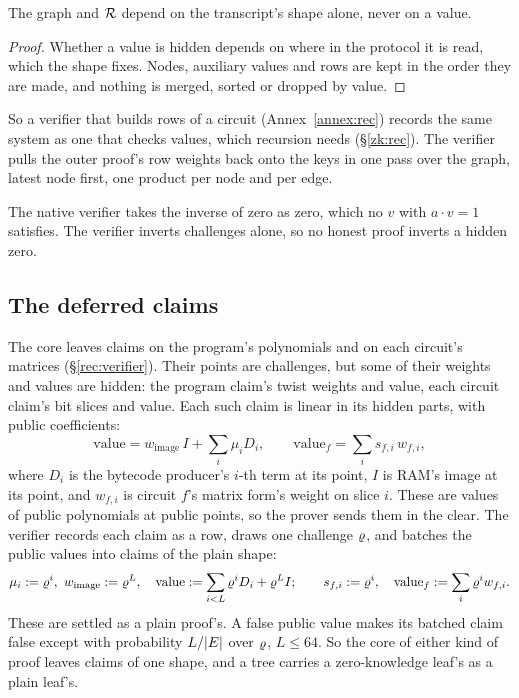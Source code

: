 \begin{lemma}\label{lem:zk-shape}
The graph and $\mathcal{R}$ depend on the transcript's shape alone, never on a value.
\end{lemma}
\begin{proof}
Whether a value is hidden depends on where in the protocol it is read, which the shape fixes. Nodes, auxiliary values and rows are kept in the order they are made, and nothing is merged, sorted or dropped by value.
\end{proof}

So a verifier that builds rows of a circuit (Annex~\ref{annex:rec}) records the same system as one that checks values, which recursion needs (\S\ref{zk:rec}). The verifier pulls the outer proof's row weights back onto the keys in one pass over the graph, latest node first, one product per node and per edge.

The native verifier takes the inverse of zero as zero, which no $v$ with $a \cdot v = 1$ satisfies. The verifier inverts challenges alone, so no honest proof inverts a hidden zero.

\subsection{The deferred claims}\label{zk:deferred}

The core leaves claims on the program's polynomials and on each circuit's matrices (\S\ref{rec:verifier}). Their points are challenges, but some of their weights and values are hidden: the program claim's twist weights and value, each circuit claim's bit slices and value. Each such claim is linear in its hidden parts, with public coefficients:
\[
\mathrm{value} = w_{\mathrm{image}}\, I + \sum_i \mu_i D_i, \qquad \mathrm{value}_f = \sum_i s_{f,i}\, w_{f,i},
\]
where $D_i$ is the bytecode producer's $i$-th term at its point, $I$ is RAM's image at its point, and $w_{f,i}$ is circuit $f$'s matrix form's weight on slice $i$. These are values of public polynomials at public points, so the prover sends them in the clear. The verifier records each claim as a row, draws one challenge $\varrho$, and batches the public values into claims of the plain shape:
\[
\mu_i := \varrho^i,\ w_{\mathrm{image}} := \varrho^{L}, \quad \mathrm{value} := \sum_{i < L} \varrho^i D_i + \varrho^L I; \qquad s_{f,i} := \varrho^i, \quad \mathrm{value}_f := \sum_i \varrho^i w_{f,i}.
\]
These are settled as a plain proof's. A false public value makes its batched claim false except with probability $L/|E|$ over $\varrho$, $L \le 64$. So the core of either kind of proof leaves claims of one shape, and a tree carries a zero-knowledge leaf's as a plain leaf's.

